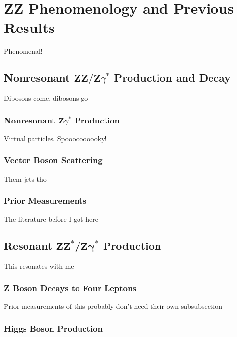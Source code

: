 
\chapter{ZZ Phenomenology and Previous Results}
Phenomenal!

\section[Nonresonant
         \texorpdfstring{$\mathrm{ZZ/Z}\gamma^\ast$}{ZZ/Zgamma*}
         Production and Decay]{Nonresonant $\mathbf{ZZ/Z}\gamma^\ast$ Production and Decay}
Dibosons come, dibosons go

\subsection[Nonresonant
            \texorpdfstring{$\mathrm{Z}\gamma^\ast$}{Zgamma*}
            Production]{Nonresonant $\mathbf{Z}\gamma^\ast$ Production}
Virtual particles. Spoooooooooky!

\subsection{Vector Boson Scattering}
Them jets tho

\subsection{Prior Measurements}
The literature before I got here


\section[Resonant
         \texorpdfstring{$\mathrm{ZZ}^\ast$/$\mathrm{Z\gamma}^\ast$}
         {ZZ*/Zgamma*}
         Production]{Resonant $\mathbf{ZZ}^\ast$/$\mathbf{Z\gamma}^\ast$ Production}
This resonates with me

\subsection{Z Boson Decays to Four Leptons}
Prior measurements of this probably don't need their own subsubsection


\subsection{Higgs Boson Production}\label{sec:Hproduction}

